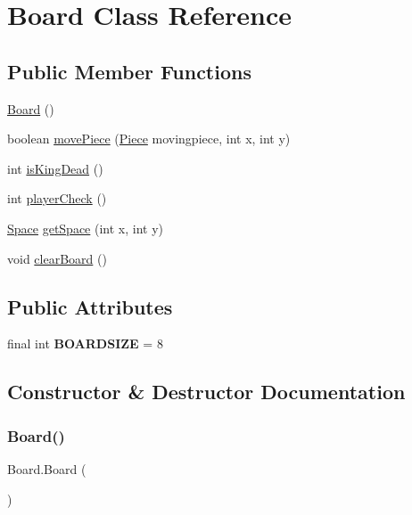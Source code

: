 \hypertarget{class_board}{}\section{Board Class Reference}
\label{class_board}
\subsection*{Public Member Functions}
\begin{DoxyCompactItemize}
\item 
\mbox{\hyperlink{class_board_ab5e792f71e2fbff747bf7b52859f2a98}{Board}} ()
\item 
boolean \mbox{\hyperlink{class_board_ad734e5041e051a8bd8a3e9d0547b9cf8}{move\+Piece}} (\mbox{\hyperlink{class_piece}{Piece}} movingpiece, int x, int y)
\item 
int \mbox{\hyperlink{class_board_a75f6d9258dc139f36c39075f3fe8491d}{is\+King\+Dead}} ()
\item 
int \mbox{\hyperlink{class_board_a137320ef896262f5d1f65e946b3395ca}{player\+Check}} ()
\item 
\mbox{\hyperlink{class_space}{Space}} \mbox{\hyperlink{class_board_a84de355cd8a8b969a6f931f77914c7d3}{get\+Space}} (int x, int y)
\item 
void \mbox{\hyperlink{class_board_ab44e7c91927bdfd4f07852c0cc48e1b8}{clear\+Board}} ()
\end{DoxyCompactItemize}
\subsection*{Public Attributes}
\begin{DoxyCompactItemize}
\item 
\mbox{\label{class_board_a5e7ffdb70768a90d75e6417ae97507fb}} 
final int {\bfseries B\+O\+A\+R\+D\+S\+I\+ZE} = 8
\end{DoxyCompactItemize}


\subsection{Constructor \& Destructor Documentation}
\mbox{\label{class_board_ab5e792f71e2fbff747bf7b52859f2a98}} 
\subsubsection{\texorpdfstring{Board()}{Board()}}
{\footnotesize\ttfamily Board.\+Board (\begin{DoxyParamCaption}{ }\end{DoxyParamCaption})\hspace{0.3cm}{\ttfamily [inline]}}

